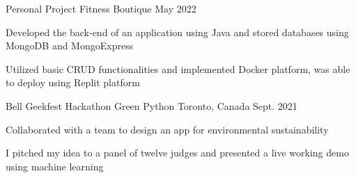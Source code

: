 \begin{cventries}
  \cventry
    {Personal Project}
    {Fitness Boutique}
    {}
    {May 2022}
    {
      \begin{cvitems}
        \item {Developed the back-end of an application using Java and stored databases using MongoDB and MongoExpress
        \item Utilized basic CRUD functionalities and implemented Docker platform, was able to deploy using Replit platform}      
        \end{cvitems}
    }
  \cventry
    {Bell Geekfest Hackathon}
    {Green Python}
    {Toronto, Canada}
    {Sept. 2021}
    {
      \begin{cvitems}
        \item {Collaborated with a team to design an app for environmental sustainability
        \item I pitched my idea to a panel of twelve judges and presented a live working demo using machine learning}      
        \end{cvitems}
    }
\end{cventries}